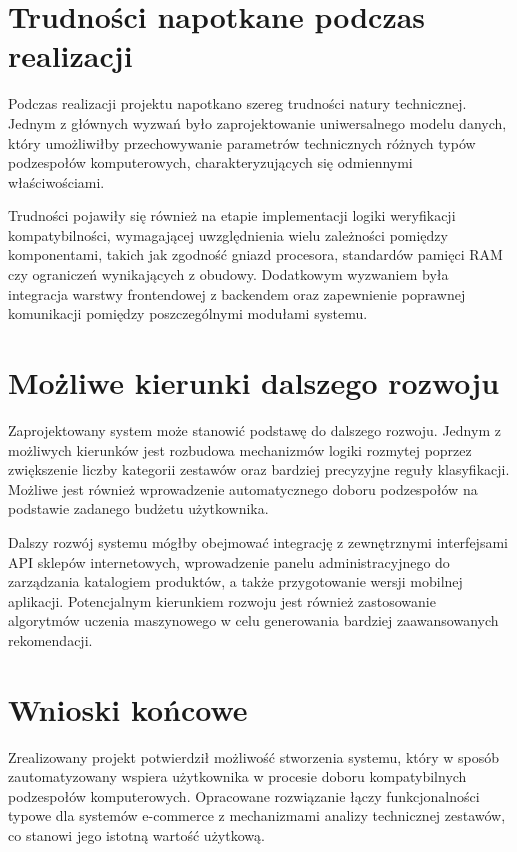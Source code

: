 \documentclass[a4paper,twoside,12pt]{book}
\begin{document}
\section{Trudności napotkane podczas realizacji}

Podczas realizacji projektu napotkano szereg trudności natury technicznej. 
Jednym z głównych wyzwań było zaprojektowanie uniwersalnego modelu danych, 
który umożliwiłby przechowywanie parametrów technicznych różnych typów 
podzespołów komputerowych, charakteryzujących się odmiennymi właściwościami.

Trudności pojawiły się również na etapie implementacji logiki weryfikacji 
kompatybilności, wymagającej uwzględnienia wielu zależności pomiędzy 
komponentami, takich jak zgodność gniazd procesora, standardów pamięci RAM 
czy ograniczeń wynikających z obudowy. Dodatkowym wyzwaniem była integracja 
warstwy frontendowej z backendem oraz zapewnienie poprawnej komunikacji 
pomiędzy poszczególnymi modułami systemu.

\section{Możliwe kierunki dalszego rozwoju}

Zaprojektowany system może stanowić podstawę do dalszego rozwoju. Jednym z 
możliwych kierunków jest rozbudowa mechanizmów logiki rozmytej poprzez 
zwiększenie liczby kategorii zestawów oraz bardziej precyzyjne reguły 
klasyfikacji. Możliwe jest również wprowadzenie automatycznego doboru 
podzespołów na podstawie zadanego budżetu użytkownika.

Dalszy rozwój systemu mógłby obejmować integrację z zewnętrznymi interfejsami 
API sklepów internetowych, wprowadzenie panelu administracyjnego do zarządzania 
katalogiem produktów, a także przygotowanie wersji mobilnej aplikacji. 
Potencjalnym kierunkiem rozwoju jest również zastosowanie algorytmów 
uczenia maszynowego w celu generowania bardziej zaawansowanych rekomendacji.

\section{Wnioski końcowe}

Zrealizowany projekt potwierdził możliwość stworzenia systemu, który w sposób 
zautomatyzowany wspiera użytkownika w procesie doboru kompatybilnych 
podzespołów komputerowych. Opracowane rozwiązanie łączy funkcjonalności 
typowe dla systemów e-commerce z mechanizmami analizy technicznej zestawów, 
co stanowi jego istotną wartość użytkową.
\end{document}
